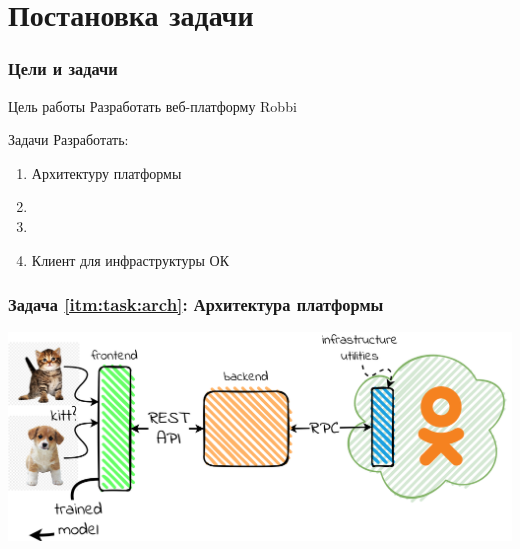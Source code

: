 \section{Постановка задачи}

\begin{frame}
\frametitle{Цели и задачи}
\begin{block}{Цель работы}
    Разработать веб-платформу Robbi
\end{block}

\bigskip
\pause

\begin{block}{Задачи}
    Разработать:
    \begin{enumerate}
        \item \label{itm:task:arch} Архитектуру платформы
        \item {}
        \item {}
        \item \label{itm:task:infra} Клиент для инфраструктуры ОК
    \end{enumerate}
\end{block}
\end{frame}

\begin{frame}
\frametitle{Задача \ref{itm:task:arch}: Архитектура платформы}
\includegraphics[width=\textwidth]{architecture.png}
\end{frame}
